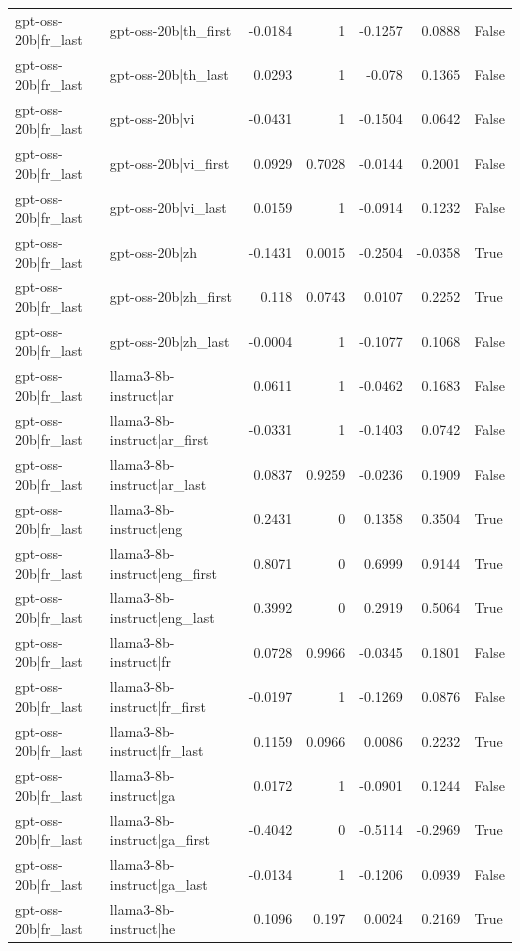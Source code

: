 \begin{table}
\begin{tabular}{l l r r r r l}
gpt-oss-20b|fr_last & gpt-oss-20b|th_first & -0.0184 & 1 & -0.1257 & 0.0888 & False \\
gpt-oss-20b|fr_last & gpt-oss-20b|th_last & 0.0293 & 1 & -0.078 & 0.1365 & False \\
gpt-oss-20b|fr_last & gpt-oss-20b|vi & -0.0431 & 1 & -0.1504 & 0.0642 & False \\
gpt-oss-20b|fr_last & gpt-oss-20b|vi_first & 0.0929 & 0.7028 & -0.0144 & 0.2001 & False \\
gpt-oss-20b|fr_last & gpt-oss-20b|vi_last & 0.0159 & 1 & -0.0914 & 0.1232 & False \\
gpt-oss-20b|fr_last & gpt-oss-20b|zh & -0.1431 & 0.0015 & -0.2504 & -0.0358 & True \\
gpt-oss-20b|fr_last & gpt-oss-20b|zh_first & 0.118 & 0.0743 & 0.0107 & 0.2252 & True \\
gpt-oss-20b|fr_last & gpt-oss-20b|zh_last & -0.0004 & 1 & -0.1077 & 0.1068 & False \\
gpt-oss-20b|fr_last & llama3-8b-instruct|ar & 0.0611 & 1 & -0.0462 & 0.1683 & False \\
gpt-oss-20b|fr_last & llama3-8b-instruct|ar_first & -0.0331 & 1 & -0.1403 & 0.0742 & False \\
gpt-oss-20b|fr_last & llama3-8b-instruct|ar_last & 0.0837 & 0.9259 & -0.0236 & 0.1909 & False \\
gpt-oss-20b|fr_last & llama3-8b-instruct|eng & 0.2431 & 0 & 0.1358 & 0.3504 & True \\
gpt-oss-20b|fr_last & llama3-8b-instruct|eng_first & 0.8071 & 0 & 0.6999 & 0.9144 & True \\
gpt-oss-20b|fr_last & llama3-8b-instruct|eng_last & 0.3992 & 0 & 0.2919 & 0.5064 & True \\
gpt-oss-20b|fr_last & llama3-8b-instruct|fr & 0.0728 & 0.9966 & -0.0345 & 0.1801 & False \\
gpt-oss-20b|fr_last & llama3-8b-instruct|fr_first & -0.0197 & 1 & -0.1269 & 0.0876 & False \\
gpt-oss-20b|fr_last & llama3-8b-instruct|fr_last & 0.1159 & 0.0966 & 0.0086 & 0.2232 & True \\
gpt-oss-20b|fr_last & llama3-8b-instruct|ga & 0.0172 & 1 & -0.0901 & 0.1244 & False \\
gpt-oss-20b|fr_last & llama3-8b-instruct|ga_first & -0.4042 & 0 & -0.5114 & -0.2969 & True \\
gpt-oss-20b|fr_last & llama3-8b-instruct|ga_last & -0.0134 & 1 & -0.1206 & 0.0939 & False \\
gpt-oss-20b|fr_last & llama3-8b-instruct|he & 0.1096 & 0.197 & 0.0024 & 0.2169 & True \\

\end{tabular}
\end{table}
